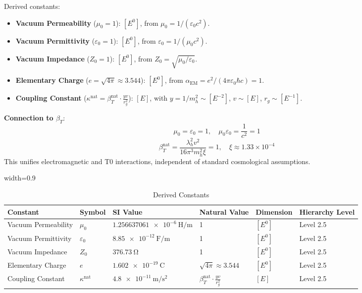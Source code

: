 ﻿\documentclass[12pt,a4paper]{article}
\newcommand{\tablescale}{0.9}
\begin{document}
\begin{itemize}
	Derived constants:
	\begin{itemize}
		\item \textbf{Vacuum Permeability} (\(\mu_0 = 1\)): \([E^0]\), from \(\mu_0 = 1/(\varepsilon_0 c^2)\).
		\item \textbf{Vacuum Permittivity} (\(\varepsilon_0 = 1\)): \([E^0]\), from \(\varepsilon_0 = 1/(\mu_0 c^2)\).
		\item \textbf{Vacuum Impedance} (\(Z_0 = 1\)): \([E^0]\), from \(Z_0 = \sqrt{\mu_0/\varepsilon_0}\).
		\item \textbf{Elementary Charge} (\(e = \sqrt{4\pi} \approx 3.544\)): \([E^0]\), from \(\alpha_{\text{EM}} = e^2/(4\pi \varepsilon_0 \hbar c) = 1\).
		\item \textbf{Coupling Constant} (\(\kappa^{\text{nat}} = \beta_T^{\text{nat}} \cdot \frac{y v}{r_g^2}\)): \([E]\), with \(y = 1/m_h^2 \sim [E^{-2}]\), \(v \sim [E]\), \(r_g \sim [E^{-1}]\).
	\end{itemize}
	
	\textbf{Connection to \(\beta_T\)}:
	\[
	\mu_0 = \varepsilon_0 = 1, \quad \mu_0 \varepsilon_0 = \frac{1}{c^2} = 1
	\]
	\[
	\beta_T^{\text{nat}} = \frac{\lambda_h^2 v^2}{16\pi^3 m_h^2 \xi} = 1, \quad \xi \approx 1.33 \times 10^{-4}
	\]
	This unifies electromagnetic and T0 interactions, independent of standard cosmological assumptions.
	
	\begin{table}[htbp]
		\centering
		\begin{adjustbox}{width=\tablescale\textwidth}
			\begin{tabular}{llllll}
				\toprule
				\textbf{Constant} & \textbf{Symbol} & \textbf{SI Value} & \textbf{Natural Value} & \textbf{Dimension} & \textbf{Hierarchy Level} \\
				\midrule
				Vacuum Permeability & \(\mu_0\) & \(\SI{1.256637061e-6}{\henry\per\meter}\) & 1 & \([E^0]\) & Level 2.5 \\
				Vacuum Permittivity & \(\varepsilon_0\) & \(\SI{8.85e-12}{\farad\per\meter}\) & 1 & \([E^0]\) & Level 2.5 \\
				Vacuum Impedance & \(Z_0\) & \(\SI{376.73}{\ohm}\) & 1 & \([E^0]\) & Level 2.5 \\
				Elementary Charge & \(e\) & \(\SI{1.602e-19}{\coulomb}\) & \(\sqrt{4\pi} \approx 3.544\) & \([E^0]\) & Level 2.5 \\
				Coupling Constant & \(\kappa^{\text{nat}}\) & \(\SI{4.8e-11}{\meter\per\second\squared}\) & \(\beta_T^{\text{nat}} \cdot \frac{y v}{r_g^2}\) & \([E]\) & Level 2.5 \\
				\bottomrule
			\end{tabular}
		\end{adjustbox}
		\caption{Derived Constants}
		\label{tab:em_const}
	\end{table}
	

\end{itemize}
\end{document}
